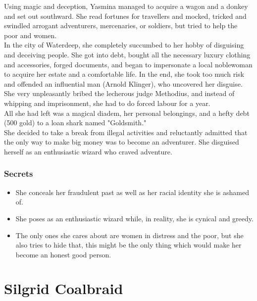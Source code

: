 \documentclass[10pt,twocolumn,twoside,openany,bg=full,layout=true,nomultitoc]{dndbook}
\begin{document}
Using magic and deception, Yasmina managed to acquire a wagon and a donkey and set out southward.
She read fortunes for travellers and mocked, tricked and swindled arrogant adventurers, mercenaries, or soldiers,
but tried to help the poor and women.\\
In the city of Waterdeep, she completely succumbed to her hobby of disguising and deceiving people.
She got into debt, bought all the necessary luxury clothing and accessories, forged documents, and began to impersonate
a local noblewoman to acquire her estate and a comfortable life.
In the end, she took too much risk and offended an influential man (Arnold Klinger), who uncovered her disguise.
She very unpleasantly bribed the lecherous judge Methodius, and instead of whipping and imprisonment,
she had to do forced labour for a year.\\
All she had left was a magical diadem, her personal belongings, and a hefty debt (500 gold) to a loan shark named "Goldsmith."\\
She decided to take a break from illegal activities and reluctantly admitted that the only way to make big money was
to become an adventurer.
She disguised herself as an enthusiastic wizard who craved adventure.

\subsubsection{Secrets}\label{subsec:yasmina-secrets}
\begin{itemize}
\item She conceals her fraudulent past as well as her racial identity she is ashamed of.
\item She poses as an enthusiastic wizard while, in reality, she is cynical and greedy.
\item The only ones she cares about are women in distress and the poor, but she also tries to hide that,
this might be the only thing which would make her become an honest good person.
\end{itemize}

\newpage


\section{Silgrid Coalbraid}\label{sec:silgrid-coalbraid}
\end{document}
